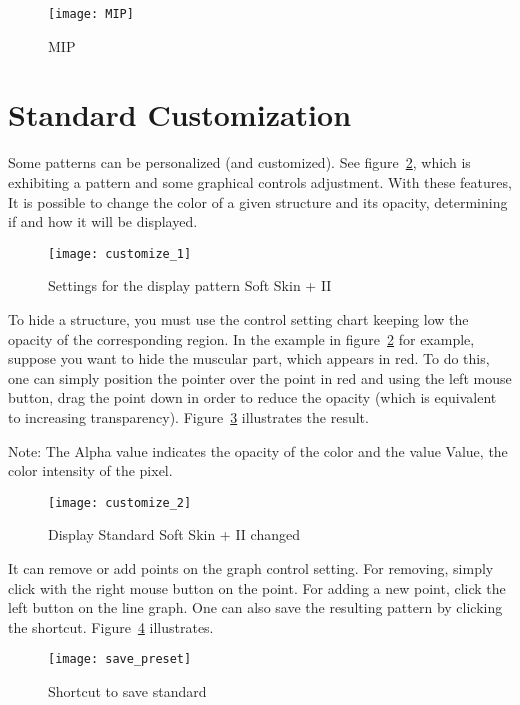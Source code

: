 \begin{figure}[!htb]
\centering
\texttt{[image: MIP]}
\caption{MIP}
\label{fig:MIP}
\end{figure}


\newpage


\section{Standard Customization}

Some patterns can be personalized (and customized). See figure~\ref{fig:customize_1}, which is exhibiting a pattern and some graphical controls adjustment. With these features, It is possible to change the color of a given structure and its opacity, determining if and how it will be displayed.

\begin{figure}[!htb]
\centering
\texttt{[image: customize\_1]}
\caption{Settings for the display pattern Soft Skin + II}
\label{fig:customize_1}
\end{figure}


\newpage

To hide a structure, you must use the control setting chart keeping low the opacity of the corresponding region. In the example in figure~\ref{fig:customize_1} for example, suppose you want to hide the muscular part, which appears in red. To do this, one can simply position the pointer over the point in red and using the left mouse button, drag the point down in order to reduce the opacity (which is equivalent to increasing transparency). Figure~\ref{fig:customize_2} illustrates the result.

Note: The Alpha value indicates the opacity of the color and the value Value, the color intensity of the pixel.

\begin{figure}[!htb]
\centering
\texttt{[image: customize\_2]}
\caption{Display Standard Soft Skin + II changed}
\label{fig:customize_2}
\end{figure}


\newpage


It can remove or add points on the graph control setting. For removing, simply click with the right mouse button on the point. For adding a new point, click the left button on the line
graph. One can also save the resulting pattern by clicking the shortcut.  Figure~\ref{fig:save_preset} illustrates.

\begin{figure}[!htb]
\centering
\texttt{[image: save\_preset]}
\caption{Shortcut to save standard}
\label{fig:save_preset}
\end{figure}
 
